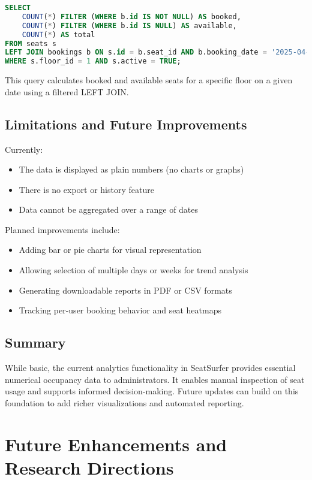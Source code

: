 \documentclass[12pt,a4paper]{report}
\begin{document}
\begin{lstlisting}[language=SQL]
SELECT 
    COUNT(*) FILTER (WHERE b.id IS NOT NULL) AS booked,
    COUNT(*) FILTER (WHERE b.id IS NULL) AS available,
    COUNT(*) AS total
FROM seats s
LEFT JOIN bookings b ON s.id = b.seat_id AND b.booking_date = '2025-04-10'
WHERE s.floor_id = 1 AND s.active = TRUE;
\end{lstlisting}

This query calculates booked and available seats for a specific floor on a given date using a filtered LEFT JOIN.

\section{Limitations and Future Improvements}

Currently:
\begin{itemize}
    \item The data is displayed as plain numbers (no charts or graphs)
    \item There is no export or history feature
    \item Data cannot be aggregated over a range of dates
\end{itemize}

Planned improvements include:
\begin{itemize}
    \item Adding bar or pie charts for visual representation
    \item Allowing selection of multiple days or weeks for trend analysis
    \item Generating downloadable reports in PDF or CSV formats
    \item Tracking per-user booking behavior and seat heatmaps
\end{itemize}

\section{Summary}

While basic, the current analytics functionality in SeatSurfer provides essential numerical occupancy data to administrators. It enables manual inspection of seat usage and supports informed decision-making. Future updates can build on this foundation to add richer visualizations and automated reporting.

\newpage

\chapter{Future Enhancements and Research Directions}
\end{document}
